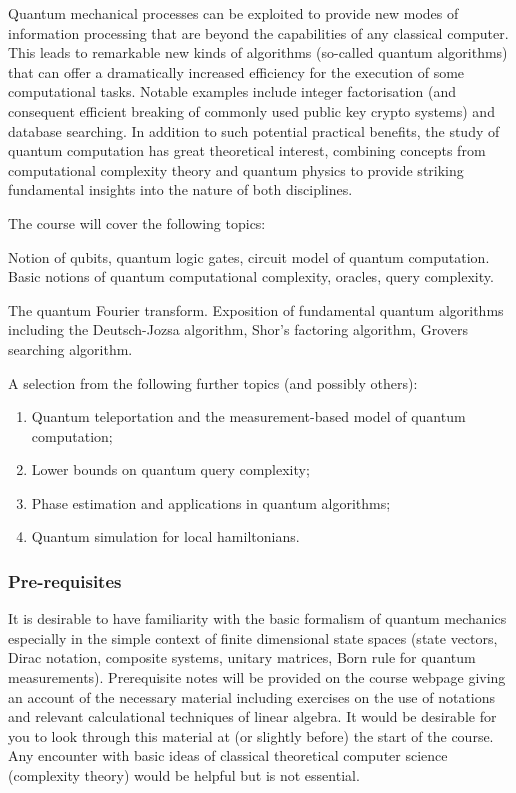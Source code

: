 \maketitle
{\small
\setlength{\parindent}{0em}
\setlength{\parskip}{1em}

Quantum mechanical processes can be exploited to provide new modes of information processing that are beyond the capabilities of any classical computer. This leads to remarkable new kinds of algorithms (so-called quantum algorithms) that can offer a dramatically increased efficiency for the execution of some computational tasks. Notable examples include integer factorisation (and consequent efficient breaking of commonly used public key crypto systems) and database searching. In addition to such potential practical benefits, the study of quantum computation has great theoretical interest, combining concepts from computational complexity theory and quantum physics to provide striking fundamental insights into the nature of both disciplines.

The course will cover the following topics:

Notion of qubits, quantum logic gates, circuit model of quantum computation. Basic notions of quantum computational complexity, oracles, query complexity.

The quantum Fourier transform. Exposition of fundamental quantum algorithms including the Deutsch-Jozsa algorithm, Shor's factoring algorithm, Grovers searching algorithm.

A selection from the following further topics (and possibly others):
\begin{enumerate}
  \item Quantum teleportation and the measurement-based model of quantum computation;
  \item Lower bounds on quantum query complexity;
  \item Phase estimation and applications in quantum algorithms;
  \item Quantum simulation for local hamiltonians.
\end{enumerate}

\subsubsection*{Pre-requisites}
It is desirable to have familiarity with the basic formalism of quantum mechanics especially in the simple context of finite dimensional state spaces (state vectors, Dirac notation, composite systems, unitary matrices, Born rule for quantum measurements). Prerequisite notes will be provided on the course webpage giving an account of the necessary material including exercises on the use of notations and relevant calculational techniques of linear algebra. It would be desirable for you to look through this material at (or slightly before) the start of the course. Any encounter with basic ideas of classical theoretical computer science (complexity theory) would be helpful but is not essential.
}

